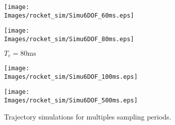 \begin{figure}[!hbt]
    \centering
    \begin{minipage}[c]{0.48\textwidth}
        \centering
        \texttt{[image: \\Images/rocket\_sim/Simu6DOF\_60ms.eps]}
        \caption*{$T_e = 60 \si{\milli\second}$}
    \end{minipage}%
    \hfill%
    \begin{minipage}[c]{0.48\textwidth}
        \centering
        \texttt{[image: \\Images/rocket\_sim/Simu6DOF\_80ms.eps]}
        \caption*{$T_e = 80 \si{\milli\second}$}
    \end{minipage}%
    \label{img:layout}
\end{figure}

\begin{figure}[!hbt]
    \centering
    \begin{minipage}[c]{0.48\textwidth}
        \centering
        \texttt{[image: \\Images/rocket\_sim/Simu6DOF\_100ms.eps]}
        \caption*{$T_e = 100 \si{\milli\second}$}
    \end{minipage}%
    \hfill%
    \begin{minipage}[c]{0.48\textwidth}
        \centering
        \texttt{[image: \\Images/rocket\_sim/Simu6DOF\_500ms.eps]}
        \caption*{$T_e = 500 \si{\milli\second}$}
    \end{minipage}%
    \label{img:traj_sim}
    \caption{Trajectory simulations for multiples sampling periods.}
\end{figure}

\FloatBarrier
